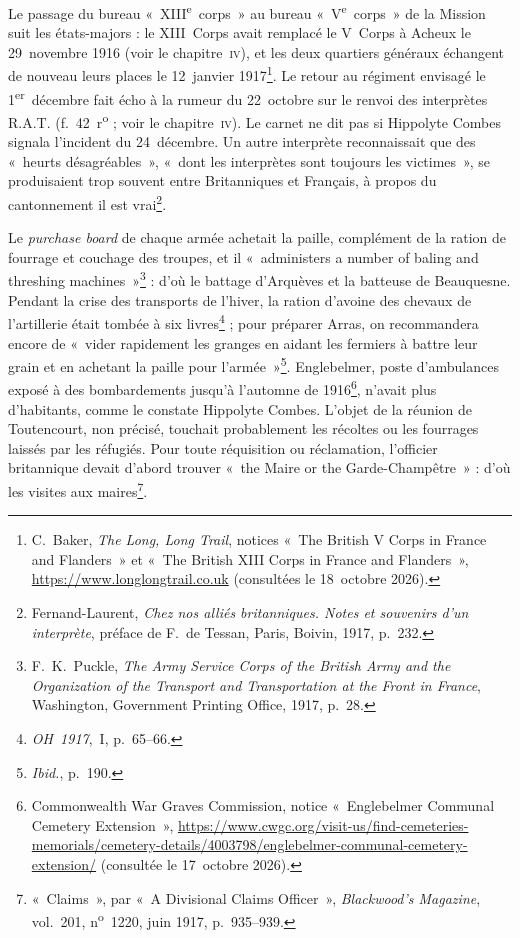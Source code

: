 Le passage du bureau «~XIII\textsuperscript{e}~corps~» au bureau «~V\textsuperscript{e}~corps~» de la Mission suit les états-majors : le XIII~Corps avait remplacé le V~Corps à Acheux le 29~novembre 1916 (voir le chapitre~\textsc{iv}), et les deux quartiers généraux échangent de nouveau leurs places le 12~janvier 1917\footnote{C.~Baker, \textit{The Long, Long Trail}, notices «~The British V Corps in France and Flanders~» et «~The British XIII Corps in France and Flanders~», \url{https://www.longlongtrail.co.uk} (consultées le 18~octobre 2026).}. Le retour au régiment envisagé le 1\textsuperscript{er}~décembre fait écho à la rumeur du 22~octobre sur le renvoi des interprètes R.A.T. (f.~42~r\textsuperscript{o} ; voir le chapitre~\textsc{iv}). Le carnet ne dit pas si Hippolyte Combes signala l'incident du 24~décembre. Un autre interprète reconnaissait que des «~heurts désagréables~», «~dont les interprètes sont toujours les victimes~», se produisaient trop souvent entre Britanniques et Français, à propos du cantonnement il est vrai\footnote{Fernand-Laurent, \textit{Chez nos alliés britanniques. Notes et souvenirs d'un interprète}, préface de F.~de Tessan, Paris, Boivin, 1917, p.~232.}.

Le \textit{purchase board} de chaque armée achetait la paille, complément de la ration de fourrage et couchage des troupes, et il «~administers a number of baling and threshing machines~»\footnote{F.~K.~Puckle, \textit{The Army Service Corps of the British Army and the Organization of the Transport and Transportation at the Front in France}, Washington, Government Printing Office, 1917, p.~28.} : d'où le battage d'Arquèves et la batteuse de Beauquesne. Pendant la crise des transports de l'hiver, la ration d'avoine des chevaux de l'artillerie était tombée à six livres\footnote{\textit{OH~1917},~I, p.~65--66.} ; pour préparer Arras, on recommandera encore de «~vider rapidement les granges en aidant les fermiers à battre leur grain et en achetant la paille pour l'armée~»\footnote{\textit{Ibid.}, p.~190.}. Englebelmer, poste d'ambulances exposé à des bombardements jusqu'à l'automne de 1916\footnote{Commonwealth War Graves Commission, notice «~Englebelmer Communal Cemetery Extension~», \url{https://www.cwgc.org/visit-us/find-cemeteries-memorials/cemetery-details/4003798/englebelmer-communal-cemetery-extension/} (consultée le 17~octobre 2026).}, n'avait plus d'habitants, comme le constate Hippolyte Combes. L'objet de la réunion de Toutencourt, non précisé, touchait probablement les récoltes ou les fourrages laissés par les réfugiés. Pour toute réquisition ou réclamation, l'officier britannique devait d'abord trouver «~the Maire or the Garde-Champêtre~» : d'où les visites aux maires\footnote{«~Claims~», par «~A Divisional Claims Officer~», \textit{Blackwood's Magazine}, vol.~201, n\textsuperscript{o}~1220, juin 1917, p.~935--939.}.


